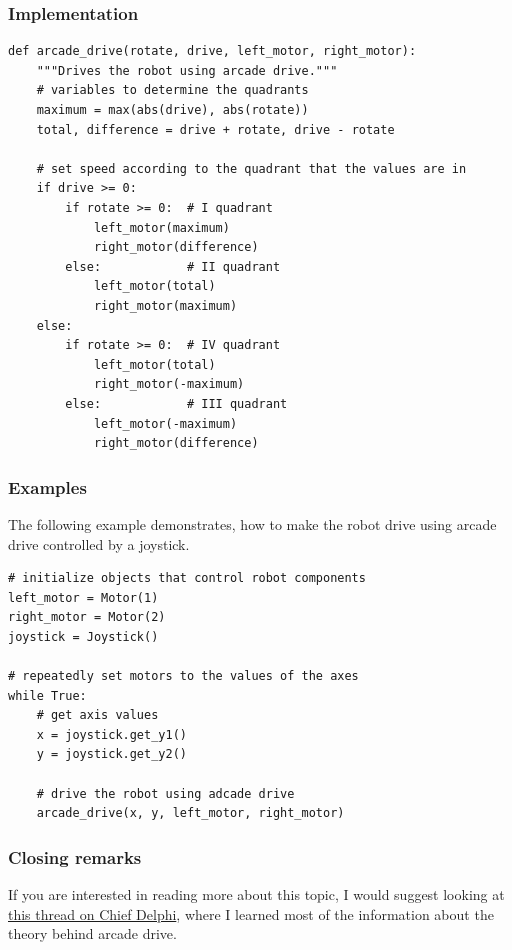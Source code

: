 \documentclass[12pt,twoside]{article}
\begin{document}
\subsubsection{Implementation}
\begin{verbatim}
def arcade_drive(rotate, drive, left_motor, right_motor):
    """Drives the robot using arcade drive."""
    # variables to determine the quadrants
    maximum = max(abs(drive), abs(rotate))
    total, difference = drive + rotate, drive - rotate

    # set speed according to the quadrant that the values are in
    if drive >= 0:
        if rotate >= 0:  # I quadrant
            left_motor(maximum)
            right_motor(difference)
        else:            # II quadrant
            left_motor(total)
            right_motor(maximum)
    else:
        if rotate >= 0:  # IV quadrant
            left_motor(total)
            right_motor(-maximum)
        else:            # III quadrant
            left_motor(-maximum)
            right_motor(difference)
\end{verbatim}



\subsubsection{Examples}
The following example demonstrates, how to make the robot drive using arcade drive controlled by a joystick.

\begin{verbatim}
# initialize objects that control robot components
left_motor = Motor(1)
right_motor = Motor(2)
joystick = Joystick()

# repeatedly set motors to the values of the axes
while True:
    # get axis values
    x = joystick.get_y1()
    y = joystick.get_y2()

    # drive the robot using adcade drive
    arcade_drive(x, y, left_motor, right_motor)
\end{verbatim}



\subsubsection{Closing remarks}
If you are interested in reading more about this topic, I would suggest looking at \href{https://www.chiefdelphi.com/media/papers/2661}{this thread on Chief Delphi}, where I learned most of the information about the theory behind arcade drive.
\end{document}
